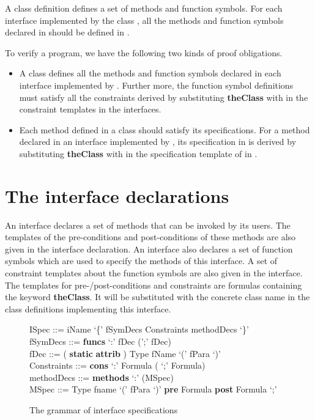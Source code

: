 \documentclass[fleqn]{llncs}
\begin{document}
A class definition  defines a set of methods and function symbols. For each interface  implemented by the class , all the methods and function
symbols declared in  should be defined in .


To verify a program, we have the following two kinds of proof obligations.
\begin{itemize}
\item A class  defines all the methods and function symbols declared in each interface implemented by . Further more, the function symbol definitions must satisfy all the  constraints derived by substituting \textbf{theClass} with  in the constraint templates in the interfaces.
\item Each method defined in a class  should satisfy its specifications. For a method  declared in an interface  implemented by , its specification in  is derived by substituting \textbf{theClass} with  in the specification template of  in .

\end{itemize}


\section{The interface declarations}\label{SEC-INTERFACE}
An interface declares a set of methods that can be invoked by its users. The templates of the pre-conditions and post-conditions of these methods are also given in the interface declaration.
An interface also declares a set of function symbols which are
used to specify the methods of this interface.
A set of constraint templates about the function symbols are also given in the interface.
The templates for pre-/post-conditions and constraints are formulas containing the keyword \textbf{theClass}. It will be substituted with the concrete class name in the
class definitions implementing this interface.


\begin{figure}
\begin{center}
\begin{minipage}{0.8\textwidth}
ISpec ::= iName `\{' fSymDecs Constraints  methodDecs `\}'\\
fSymDecs ::=   \textbf{funcs} `:' fDec (';' fDec)\\
fDec  ::= ( \textbf{static}  \textbf{attrib}   ) Type fName `(' fPara `)'\\
Constraints  ::=   \textbf{cons} `:' Formula ( `;' Formula)\\
methodDecs ::=   \textbf{methods} `:' (MSpec)\\
MSpec  ::= Type fname `(' fPara `)' \textbf{pre} Formula \textbf{post} Formula `;'
\end{minipage}
\end{center}
\caption{The grammar of interface specifications}\label{SYN-INTERFACE-SPECIFICATION}
\end{figure}
\end{document}
